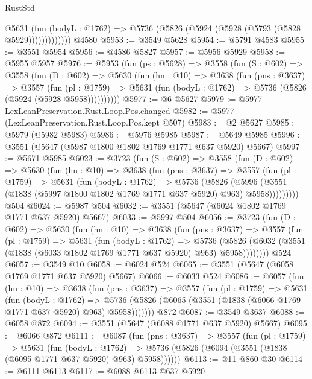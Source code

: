 \begin{lexlean}{RustStd}
\begin{coremodule}
                @5631
                  (fun (bodyL : @1762) =>
                  @5736 (@5826 (@5924 (@5928 (@5793 (@5828 @5929)))))))))))))
    @4580
@5953 := @3549 @5628
@5954 := @5791 @4583
@5955 := @3551 @5954
@5956 := @4586 @5827
@5957 := @5956 @5929
@5958 := @5955 @5957
@5976 := @5953
    (fun (ps : @5628) =>
    @3558
      (fun (S : @602) =>
      @3558
        (fun (D : @602) =>
        @5630
          (fun (hn : @10) =>
          @3638
            (fun (pns : @3637) =>
            @3557
              (fun (pl : @1759) =>
              @5631 (fun (bodyL : @1762) => @5736 (@5826 (@5924 (@5928 @5958))))))))))
@5977 := @6 @5627
@5979 := @5977 LexLeanPreservation.Rust.Loop.Pos.changed
@5982 := @5977 (LexLeanPreservation.Rust.Loop.Pos.kept @507)
@5983 := @2 @5627
@5985 := @5979 (@5982 @5983)
@5986 := @5976 @5985
@5987 := @5649 @5985
@5996 := @3551 (@5647 (@5987 @1800 @1802 @1769 @1771 @637 @5920) @5667)
@5997 := @5671 @5985
@6023 := @3723
    (fun (S : @602) =>
    @3558
      (fun (D : @602) =>
      @5630
        (fun (hn : @10) =>
        @3638
          (fun (pns : @3637) =>
          @3557
            (fun (pl : @1759) =>
            @5631
              (fun (bodyL : @1762) =>
              @5736
                (@5826
                  (@5996
                    (@3551 (@1838 (@5997 @1800 @1802 @1769 @1771 @637 @5920) @963) @5958)))))))))
    @504
@6024 := @5987 @504
@6032 := @3551 (@5647 (@6024 @1802 @1769 @1771 @637 @5920) @5667)
@6033 := @5997 @504
@6056 := @3723
    (fun (D : @602) =>
    @5630
      (fun (hn : @10) =>
      @3638
        (fun (pns : @3637) =>
        @3557
          (fun (pl : @1759) =>
          @5631
            (fun (bodyL : @1762) =>
            @5736
              (@5826 (@6032 (@3551 (@1838 (@6033 @1802 @1769 @1771 @637 @5920) @963) @5958))))))))
    @524
@6057 := @3549 @10
@6058 := @6024 @524
@6065 := @3551 (@5647 (@6058 @1769 @1771 @637 @5920) @5667)
@6066 := @6033 @524
@6086 := @6057
    (fun (hn : @10) =>
    @3638
      (fun (pns : @3637) =>
      @3557
        (fun (pl : @1759) =>
        @5631
          (fun (bodyL : @1762) =>
          @5736 (@5826 (@6065 (@3551 (@1838 (@6066 @1769 @1771 @637 @5920) @963) @5958)))))))
    @872
@6087 := @3549 @3637
@6088 := @6058 @872
@6094 := @3551 (@5647 (@6088 @1771 @637 @5920) @5667)
@6095 := @6066 @872
@6111 := @6087
    (fun (pns : @3637) =>
    @3557
      (fun (pl : @1759) =>
      @5631
        (fun (bodyL : @1762) =>
        @5736 (@5826 (@6094 (@3551 (@1838 (@6095 @1771 @637 @5920) @963) @5958))))))
@6113 := @11 @860 @30
@6114 := @6111 @6113
@6117 := @6088 @6113 @637 @5920

\end{coremodule}
\end{lexlean}
